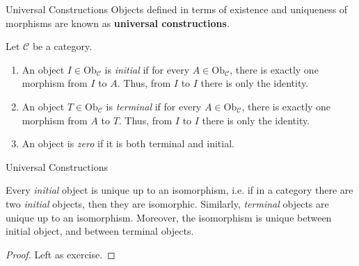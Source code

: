 \documentclass[aspectratio=169,xcolor=dvipsnames,10pt]{beamer}
\theoremstyle{definition}
\begin{document}
\begin{frame}[fragile]{Universal Constructions}
	Objects defined in terms of existence and
	uniqueness of morphisms are known as \textbf{universal constructions}.
	\begin{definition}
		Let $\mathcal C$ be a category.
		\begin{enumerate}[1.]
			\item An object $I \in \text{Ob}_\mathcal C$ is \textit{initial} if for every $A \in \text{Ob}_\mathcal C$,
			      there is exactly one morphism from $I$ to $A$. Thus, from $I$ to $I$ there is only the identity.
			\item An object $T \in \text{Ob}_\mathcal C$ is \textit{terminal} if for every $A \in \text{Ob}_\mathcal C$,
			      there is exactly one morphism from $A$ to $T$. Thus, from $I$ to $I$ there is only the identity.
			\item An object is \textit{zero} if it is both terminal and initial.
		\end{enumerate}
	\end{definition}
\end{frame}


\begin{frame}[fragile]{Universal Constructions}
    \begin{theorem}
        Every \textit{initial} object is unique up to an isomorphism, i.e. if in a category there
        are two \textit{initial} objects, then they are isomorphic.
        Similarly, \textit{terminal} objects are unique up to an isomorphism.
        Moreover, the isomorphism is unique between initial object, and between terminal objects.
    \end{theorem}
    \begin{proof}
        Left as exercise.
    \end{proof}
\end{frame}

\end{document}
